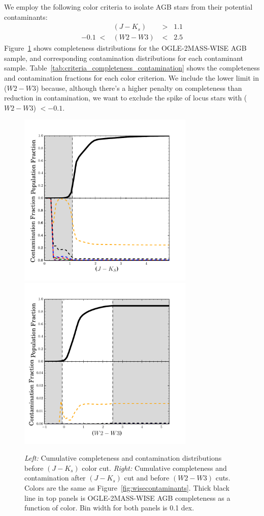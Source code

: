 We employ the following color criteria to isolate AGB stars from their potential contaminants:
\begin{eqnarray}
&(J - K_s) &>\;\;1.1\label{eq:criteria1}\\
-0.1\;<&(W2 - W3) &<\;\; 2.5\label{eq:criteria2}
\end{eqnarray}
\noindent Figure~\ref{fig:colorcuts} shows completeness distributions for the OGLE-2MASS-WISE AGB sample, and corresponding contamination distributions for each contaminant sample. Table~\ref{tab:criteria_completeness_contamination} shows the completeness and contamination fractions for each color criterion. We include the lower limit in ($W2-W3$) because, although there's a higher penalty on completeness than reduction in contamination, we want to exclude the spike of locus stars with ($W2-W3$) $< -0.1$.

\begin{figure}[h]
\includegraphics[width=3.3in]{figs/completeness_contamination_jkcut.pdf}\includegraphics[width=3.3in]{figs/completeness_contamination_allcuts.pdf}
\caption{\emph{Left:} Cumulative completeness and contamination distributions before $(J-K_s)$ color cut. \emph{Right:} Cumulative completeness and contamination after $(J-K_s)$ cut and before $(W2-W3)$ cuts. Colors are the same as Figure~\ref{fig:wisecontaminants}. Thick black line in top panels is OGLE-2MASS-WISE AGB completeness as a function of color. Bin width for both panels is 0.1 dex. \label{fig:colorcuts}}
\end{figure}

